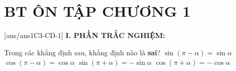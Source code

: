 \section*{BT ÔN TẬP CHƯƠNG 1}
\setcounter{ex}{0}\setcounter{bt}{0}
[ans/ans1C3-CD-1]
\noindent\textbf{I. PHẦN TRẮC NGHIỆM:}


\begin{ex}%
	Trong các khẳng định sau, khẳng định  nào là \textbf{sai}?
	\choice
	{$\sin(\pi-\alpha)=\sin\alpha$}
	{\True $\cos(\pi-\alpha)=\cos \alpha$}
	{$\sin(\pi+\alpha)=-\sin\alpha$}
	{$\cos(\pi+\alpha)=-\cos \alpha$}
\end{ex}

